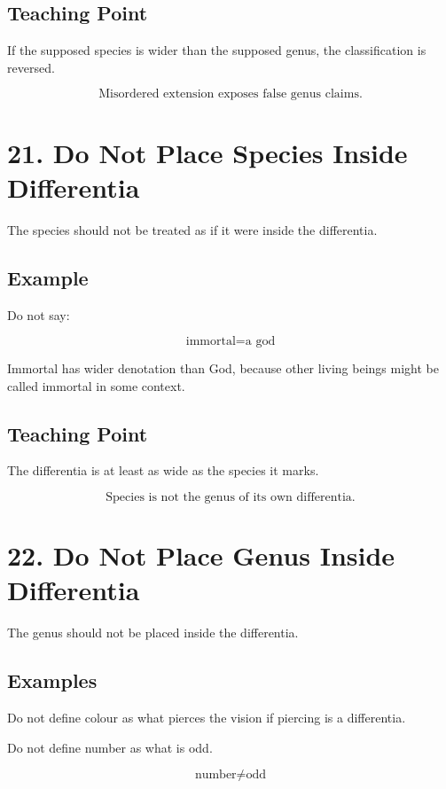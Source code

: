 \documentclass[12pt]{article}
\begin{document}
\subsection*{Teaching Point}

If the supposed species is wider than the supposed genus, the classification is
reversed.

\[
\boxed{
\text{Misordered extension exposes false genus claims.}
}
\]

\section*{21. Do Not Place Species Inside Differentia}

The species should not be treated as if it were inside the differentia.

\subsection*{Example}

Do not say:

\[
\text{immortal} = \text{a god}
\]

Immortal has wider denotation than God, because other living beings might be
called immortal in some context.

\subsection*{Teaching Point}

The differentia is at least as wide as the species it marks.

\[
\boxed{
\text{Species is not the genus of its own differentia.}
}
\]

\section*{22. Do Not Place Genus Inside Differentia}

The genus should not be placed inside the differentia.

\subsection*{Examples}

Do not define colour as what pierces the vision if piercing is a differentia.

Do not define number as what is odd.

\[
\text{number} \neq \text{odd}
\]
\end{document}
